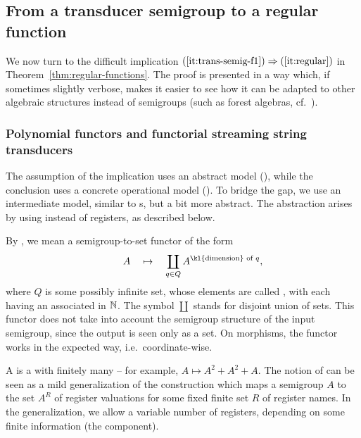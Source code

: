\subsection{From a transducer semigroup to a regular function}
\label{sec:hard}
We now turn to the difficult implication $(\ref{it:trans-semig-f1}) \Rightarrow (\ref{it:regular})$ in Theorem~\ref{thm:regular-functions}. 
 The proof is presented in a way which, if sometimes slightly verbose, makes it
 easier to see how it can be adapted to other algebraic structures instead of
 semigroups (such as forest algebras, cf.~).

\subsubsection{Polynomial functors and functorial streaming string transducers}
\label{sec:abstract-sst} 
The assumption of the implication uses an abstract model (), while the conclusion uses a concrete operational model (). To bridge the gap, we use an intermediate model, similar to \sst{}s, but a bit more abstract. The abstraction arises by using  instead of registers, as described below. 

\begin{definition}
  By , we mean a semigroup-to-set functor of the form
\begin{align*}
\qquad A \quad \mapsto \quad \coprod_{q \in Q} A^{\text{\kl{dimension} of } q},
\end{align*}
where $Q$ is some possibly infinite set, whose elements are called , with each  having an associated  in ${\mathbb N}$. The symbol $\coprod$ stands for disjoint union of sets. This functor does not take into account the semigroup structure of the input semigroup, since the output is seen only as a set.
On morphisms, the functor works in the expected way, i.e.~coordinate-wise.  
\end{definition}

\AP A  is a  with finitely many  -- for example, $A \mapsto A^2 + A^2 + A$. 
The notion of  can be seen as a mild generalization of the construction which maps a semigroup $A$ to the set $A^R$ of register valuations for some fixed finite set $R$ of register names.  In the generalization, we allow a variable number of registers, depending on some finite information (the component). 

